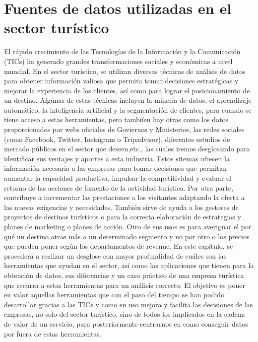 \documentclass[
  letterpaper,
  DIV=11,
  numbers=noendperiod]{scrreprt}
\begin{document}
\hypertarget{fuentes-de-datos-utilizadas-en-el-sector-turuxedstico}{%
\section{Fuentes de datos utilizadas en el sector
turístico}\label{fuentes-de-datos-utilizadas-en-el-sector-turuxedstico}}

El rápido crecimiento de las Tecnologías de la Información y la
Comunicación (TICs) ha generado grandes transformaciones sociales y
económicas a nivel mundial. En el sector turístico, se utilizan diversas
técnicas de análisis de datos para obtener información valiosa que
permita tomar decisiones estratégicas y mejorar la experiencia de los
clientes, así como para lograr el posicionamiento de un destino. Algunas
de estas técnicas incluyen la minería de datos, el aprendizaje
automático, la inteligencia artificial y la segmentación de clientes,
para cuando se tiene acceso a estas herramientas, pero tambiíen hay
otras como los datos proporcionados por webs oficiales de Goviernos y
Ministerios, las redes sociales (como Facebook, Twitter, Instagram o
Tripadvisor), diferentes estudios de mercado públicos en el sector que
deseen,etc., las cuales iremos desglosando para identificar sus ventajes
y aportes a esta industria. Estos sitemas ofrecen la información
necesaria a las empresas para tomar decisiones que permitan aumentar la
capacidad productiva, impulsar la competitividad y evaluar el retorno de
las acciones de fomento de la actividad turística. Por otra parte,
contribuye a incrementar las prestaciones a los visitantes adaptando la
oferta a las nuevas exigencias y necesidades. También sirve de ayuda a
los gestores de proyectos de destinos turísticos o para la correcta
elaboración de estrategias y planes de marketing o planes de acción.
Otro de sus usos es para averiguar el por qué un destino atrae más a un
determinado segmento y no por otro o los precios que pueden poner según
los departamentos de revenue. En este capítulo, se procederá a realizar
un desglose con mayor profundidad de cuáles son las herramientas que
ayudan en el sector, así como las aplicaciones que tienen para la
obtención de datos, sus diferencias y un caso práctico de una empresa
turística que recurra a estas herramientas para un análisis correcto. El
objetivo es poner en valor aquellas herramientas que con el paso del
tiempo se han podido desarrollar gracias a las TICs y como su uso mejora
y facilita las decisiones de las empresas, no solo del sector turístico,
sino de todos los implicados en la cadena de valor de un servicio, para
posteriormente centrarnos en como conseguir datos por fuera de estas
herramientas.
\end{document}
